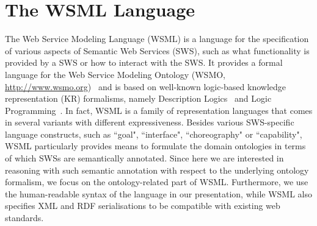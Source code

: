 \newcommand{\concept}[1]{\wsmlname{#1}}
\newcommand{\attribute}[1]{\wsmlname{#1}}
\newcommand{\instance}[1]{\wsmlname{#1}}

\section{The WSML Language}\label{sec:wsml}
The Web Service Modeling Language (WSML) \cite{wsml} is a language
for the specification of various aspects of Semantic Web Services
(SWS), such as what functionality is provided by a SWS or how to
interact with the SWS. It provides a formal language for the Web
Service Modeling Ontology (WSMO,
{\url{http://www.wsmo.org}})~\cite{roman05:_web_servic_model_ontol}
and is based on well-known logic-based knowledge representation (KR)
formalisms, namely Description
Logics~\cite{Baader+CalvaneseETAL-DescLogiHand:03} and Logic
Programming~\cite{lloyd-FoundationsOfLP}. In fact, WSML is a family
of representation languages that comes in several variants with
different expressiveness. Besides various SWS-specific language
constructs, such as ``goal", ``interface", ``choreography" or
``capability", WSML particularly provides means to formulate the
domain ontologies in terms of which SWSs are semantically annotated.
Since here we are interested in reasoning with such semantic
annotation with respect to the underlying ontology formalism, we
focus on the ontology-related part of WSML. Furthermore, we use the
human-readable syntax of the language in our presentation, while
WSML also specifies XML and RDF serialisations to be compatible with
existing web standards.


